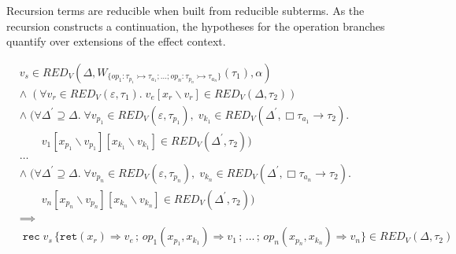 \documentclass[acmsmall, screen, review, anonymous]{acmart}
\theoremstyle{definition}
\newcommand{\glob}{\mathop{\Box}}
\newcommand{\arr}{\rightarrow}
\newcommand{\ind}[1]{W_{#1}}
\newcommand{\retname}{\mathtt{ret}}
\newcommand{\indelimname}{\mathtt{rec}}
\newcommand{\indelim}[2]{\mathop{\indelimname} #1 \,\{#2\}}
\newcommand{\indretcase}[2]{\retname(#1) \Rightarrow #2}
\newcommand{\indcase}[4]{#1(#2, #3) \Rightarrow #4}
\newcommand{\seq}{\,;\,}
\newcommand{\types}{\mathrel{:}}
\newcommand{\cempty}{\varepsilon}
\newcommand{\sub}[2]{[#1\backslash#2]}
\newcommand{\sbst}[3]{#1\sub{#2}{#3}}
\newcommand{\redname}{RED}
\newcommand{\redvname}{\redname_{V}}
\newcommand{\redv}[2]{\redvname{({#1},{#2})}}
\newcommand{\redva}[3]{\redvname{({#1},{#2},{#3})}}
\begin{document}
Recursion terms are reducible when built from reducible subterms. As
the recursion constructs a continuation, the hypotheses for the
operation branches quantify over extensions of the effect context.
\begin{lemma}
\label{lemma:red-rec}
\begin{align*}
  &v_s \in \redva{\Delta}{\ind{\{ op_1 \types \tau_{p_1} \rightarrowtail \tau_{a_1};
      \ldots; op_n\types \tau_{p_n} \rightarrowtail \tau_{a_n} \}}(\tau_1)}{\alpha} \\
  &\wedge \; (\forall v_r \in \redv{\cempty}{\tau_1}. \;
      \sbst{v_e}{x_r}{v_r} \in \redv{\Delta}{\tau_2}) \\
  &\wedge \; (\forall \Delta^{\prime} \supseteq \Delta. \;
      \forall v_{p_1} \in \redv{\cempty}{\tau_{p_1}}, \;
      v_{k_1} \in \redv{\Delta^{\prime}}{\glob \tau_{a_1} \arr \tau_2}. \\
    &\qquad \sbst{\sbst{v_1}{x_{p_1}}{v_{p_1}}}{x_{k_1}}{v_{k_1}} \in \redv{\Delta^{\prime}}{\tau_2}) \\
  &\ldots \\
  &\wedge \; (\forall \Delta^{\prime} \supseteq \Delta. \;
      \forall v_{p_n} \in \redv{\cempty}{\tau_{p_n}}, \;
      v_{k_n} \in \redv{\Delta^{\prime}}{\glob \tau_{a_n} \arr \tau_2}. \\
    &\qquad \sbst{\sbst{v_n}{x_{p_n}}{v_{p_n}}}{x_{k_n}}{v_{k_n}} \in \redv{\Delta^{\prime}}{\tau_2}) \\
  &\implies \\
  &\indelim{v_s}{\indretcase{x_r}{v_e} \seq
            \indcase{op_1}{x_{p_1}}{x_{k_1}}{v_1} \seq \ldots \seq
            \indcase{op_n}{x_{p_n}}{x_{k_n}}{v_n}}
    \in \redv{\Delta}{\tau_2}
\end{align*}
\end{lemma}
\end{document}
